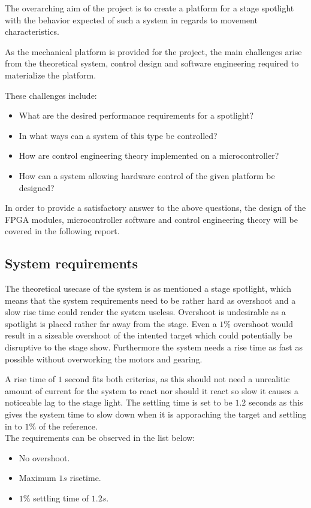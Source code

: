 \documentclass[../../main]{subfiles}
\begin{document}
The overarching aim of the project is to create a platform for a stage spotlight with the behavior expected of such a system in regards to movement characteristics.

As the mechanical platform is provided for the project, the main challenges arise from the theoretical system, control design and software engineering required to materialize the platform.

These challenges include:

\begin{itemize}
    \item What are the desired performance requirements for a spotlight?
    \item In what ways can a system of this type be controlled?
    \item How are control engineering theory implemented on a microcontroller?
    \item How can a system allowing hardware control of the given platform be designed?
\end{itemize}

In order to provide a satisfactory answer to the above questions, the design of the FPGA modules, microcontroller software and control engineering theory will be covered in the following report.

\subsection{System requirements}

The theoretical usecase of the system is as mentioned a stage spotlight, which means that the system requirements need to be rather hard as overshoot and a slow rise time could render the system useless.
Overshoot is undesirable as a spotlight is placed rather far away from the stage. Even a $1\%$ overshoot would result in a sizeable overshoot of the intented target which could potentially be disruptive to the stage show.
Furthermore the system needs a rise time as fast as possible without overworking the motors and gearing.

A rise time of $1$ second fits both criterias, as this should not need a unrealitic amount of current for the system to react nor should it react so slow it causes a noticeable lag to the stage light.
The settling time is set to be $1.2$ seconds as this gives the system time to slow down when it is apporaching the target and settling in to $1\%$ of the reference.
\\
The requirements can be observed in the list below:

\begin{itemize}
  \item No overshoot.
  \item Maximum $1s$ risetime.
  \item $1\%$ settling time of $1.2s$.
\end{itemize}
\end{document}
